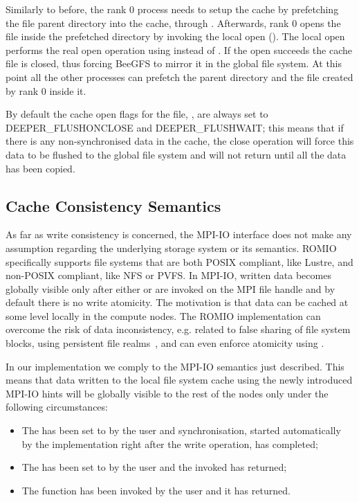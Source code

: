 Similarly to before, the rank 0 process needs to setup the cache by prefetching the file parent directory into the cache, through . Afterwards, rank 0 opens the file inside the prefetched directory 
by invoking the local open (). The local open performs the real open operation using  instead of . If the open succeeds the cache file is closed, thus 
forcing BeeGFS to mirror it in the global file system. At this point all the other processes can prefetch the parent directory and the file created by rank 0 inside it.

By default the cache open flags for the file, , are always set to DEEPER\_FLUSHONCLOSE and DEEPER\_FLUSHWAIT; this means that if there is any non-synchronised data in the cache, the close operation will force 
this data to be flushed to the global file system and will not return until all the data has been copied.

\subsection{Cache Consistency Semantics}
\label{subsec: consistency}
As far as write consistency is concerned, the MPI-IO interface does not make any assumption regarding the underlying storage system or its semantics. ROMIO specifically supports file systems that are both POSIX compliant, like Lustre, 
and non-POSIX compliant, like NFS or PVFS. In MPI-IO, written data becomes globally visible only after either  or  are invoked on the MPI file handle and by default there is no write 
atomicity. The motivation is that data can be cached at some level locally in the compute nodes. The ROMIO implementation can overcome the risk of data inconsistency, e.g. related to false sharing of file system blocks, using persistent file 
realms~\cite{ColomaCWWRP04}, and can even enforce atomicity using .

In our implementation we comply to the MPI-IO semantics just described. This means that data written to the local file system cache using the newly introduced MPI-IO hints will be globally visible to the rest of the nodes only under the 
following circumstances:

\begin{itemize}
\item The  has been set to  by the user and synchronisation, started automatically by the implementation right after the write operation, has completed;
\item The  has been set to  by the user and the invoked  has returned;
\item The  function has been invoked by the user and it has returned.
\end{itemize}

